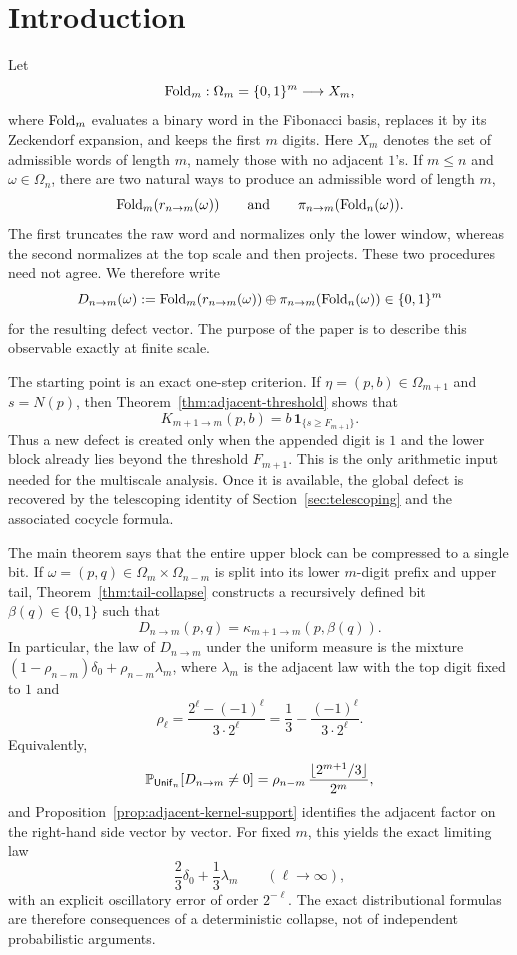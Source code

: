 \section{Introduction}

Let
\[
\operatorname{Fold}_m:\Omega_m=\{0,1\}^m\longrightarrow X_m,
\]
where $\operatorname{Fold}_m$ evaluates a binary word in the Fibonacci basis, replaces it by
its Zeckendorf expansion, and keeps the first $m$ digits.  Here $X_m$ denotes
the set of admissible words of length $m$, namely those with no adjacent
$1$'s.  If $m\le n$ and $\omega\in\Omega_n$, there are two natural ways to
produce an admissible word of length $m$,
\[
\operatorname{Fold}_m(r_{n\to m}(\omega))
\qquad\text{and}\qquad
\pi_{n\to m}(\operatorname{Fold}_n(\omega)).
\]
The first truncates the raw word and normalizes only the lower window, whereas
the second normalizes at the top scale and then projects.  These two
procedures need not agree.  We therefore write
\[
D_{n\to m}(\omega)
:=
\operatorname{Fold}_m(r_{n\to m}(\omega))
\oplus
\pi_{n\to m}(\operatorname{Fold}_n(\omega))
\in \{0,1\}^m
\]
for the resulting defect vector.  The purpose of the paper is to describe this
observable exactly at finite scale.

The starting point is an exact one-step criterion.  If
$\eta=(p,b)\in\Omega_{m+1}$ and $s=N(p)$, then
Theorem~\ref{thm:adjacent-threshold} shows that
\[
K_{m+1\to m}(p,b)=b\,\mathbf{1}_{\{s\ge F_{m+1}\}}.
\]
Thus a new defect is created only when the appended digit is $1$ and the lower
block already lies beyond the threshold $F_{m+1}$.  This is the only
arithmetic input needed for the multiscale analysis.  Once it is available,
the global defect is recovered by the telescoping identity of
Section~\ref{sec:telescoping} and the associated cocycle formula.

The main theorem says that the entire upper block can be compressed to a single
bit.  If $\omega=(p,q)\in\Omega_m\times\Omega_{n-m}$ is split into its lower
$m$-digit prefix and upper tail, Theorem~\ref{thm:tail-collapse} constructs a
recursively defined bit $\beta(q)\in\{0,1\}$ such that
\[
D_{n\to m}(p,q)=\kappa_{m+1\to m}(p,\beta(q)).
\]
In particular, the law of $D_{n\to m}$ under the uniform measure is the
mixture $(1-\rho_{n-m})\delta_0+\rho_{n-m}\lambda_m$, where $\lambda_m$ is the
adjacent law with the top digit fixed to $1$ and
\[
\rho_\ell=\frac{2^\ell-(-1)^\ell}{3\cdot 2^\ell}
=
\frac13-\frac{(-1)^\ell}{3\cdot 2^\ell}.
\]
Equivalently,
\[
\mathbb{P}_{\mathsf{Unif}_n}[D_{n\to m}\ne 0]
=
\rho_{n-m}\,\frac{\lfloor 2^{m+1}/3\rfloor}{2^m},
\]
and Proposition~\ref{prop:adjacent-kernel-support} identifies the adjacent
factor on the right-hand side vector by vector.  For fixed $m$, this yields the
exact limiting law
\[
\frac23\delta_0+\frac13\lambda_m
\qquad (\ell\to\infty),
\]
with an explicit oscillatory error of order $2^{-\ell}$.  The exact
distributional formulas are therefore consequences of a deterministic collapse,
not of independent probabilistic arguments.

